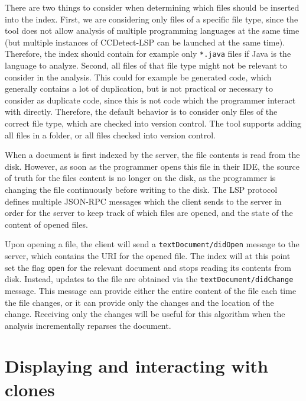 There are two things to consider when determining which files should be inserted into the
index. First, we are considering only files of a specific file type, since the tool does
not allow analysis of multiple programming languages at the same time (but multiple
instances of CCDetect-LSP can be launched at the same time). Therefore, the index should
contain for example only \verb|*.java| files if Java is the language to analyze. Second,
all files of that file type might not be relevant to consider in the analysis. This could
for example be generated code, which generally contains a lot of duplication, but is not
practical or necessary to consider as duplicate code, since this is not code which the
programmer interact with directly. Therefore, the default behavior is to consider only
files of the correct file type, which are checked into version control. The tool supports
adding all files in a folder, or all files checked into version control.

When a document is first indexed by the server, the file contents is read from the disk.
However, as soon as the programmer opens this file in their IDE, the source of truth for
the files content is no longer on the disk, as the programmer is changing the file
continuously before writing to the disk. The LSP protocol defines multiple JSON-RPC
messages which the client sends to the server in order for the server to keep track of
which files are opened, and the state of the content of opened files.

Upon opening a file, the client will send a \verb|textDocument/didOpen| message to the
server, which contains the URI for the opened file. The index will at this point set the
flag \verb|open| for the relevant document and stops reading its contents from disk.
Instead, updates to the file are obtained via the \verb|textDocument/didChange| message.
This message can provide either the entire content of the file each time the file changes,
or it can provide only the changes and the location of the change. Receiving only the
changes will be useful for this algorithm when the analysis incrementally reparses the
document.

\section{Displaying and interacting with clones}

